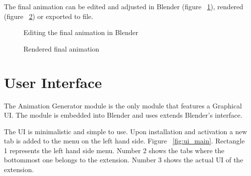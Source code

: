The final animation can be edited and adjusted in Blender (figure ~\ref{fig:finalblend}), rendered (figure ~\ref{fig:finalrend}) or exported to file.


\begin{figure}[H]
\centerline{}
\caption{Editing the final animation in Blender}\label{fig:finalblend}
\end{figure}
\begin{figure}[H]
\centerline{}
\caption{Rendered final animation}\label{fig:finalrend}
\end{figure}

\section{User Interface}

The Animation Generator module is the only module that features a Graphical UI. The module is embedded into Blender and uses extends Blender's interface. 

The UI is minimalistic and simple to use. Upon installation and activation a new tab is added to the menu on the left hand side. Figure ~\ref {fig:ui_main}. Rectangle 1 represents the left hand side menu. Number 2 shows the tabs where the bottommost one belongs to the extension. Number 3 shows the actual UI of the extension.

